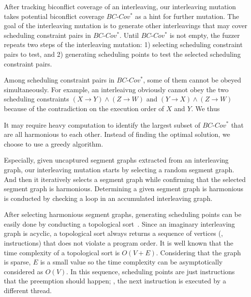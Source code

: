 \newcommand{\segment}{segment graph\xspace}
\newcommand{\segments}{segment graphs\xspace}
\newcommand{\Segments}{Segment graphs\xspace}


After tracking biconflict coverage of an interleaving, our
interleaving mutation takes potential biconflict coverage
$BC\mbox{-}Cov^*$ as a hint for further mutation.
%
The goal of the interleaving mutation is to generate other
interleavings that may cover scheduling constraint pairs in
$BC\mbox{-}Cov^*$.
%
Until $BC\mbox{-}Cov^*$ is not empty, the fuzzer repeats two steps of
the interleaving mutation:
%
1) selecting scheduling constraint pairs to test, and
2) generating scheduling points to test the selected scheduling
constraint pairs.


%
Among scheduling constraint pairs in $BC\mbox{-}Cov^*$, some of them
cannot be obeyed simultaneously.
%
For example, an interleaivng obviously cannot obey the two scheduling
constraints $(X \rightarrow Y)\wedge (Z \rightarrow W)$ and
$(Y \rightarrow X)\wedge (Z \rightarrow W)$ because of the
contradiction on the execution order of $X$ and $Y$.
%
We thus 


It may require heavy computation to identify the largest subset of
$BC\mbox{-}Cov^*$ that are all harmonious to each other.
%
Instead of finding the optimal solution, we choose to use a greedy
algorithm.
%


Especially, given uncaptured \segments extracted from an interleaving
graph, our interleaving mutation starts by selecting a random
\segment.
%
And then it iteratively selects a \segment while confirming that the
selected \segment is harmonious.
%
Determining a given \segment is harmonious is conducted by checking a
loop in an accumulated interleaving graph.



%
After selecting harmonious \segments, generating scheduling points can
be easily done by conducting a topological
sort~\cite{topologicalsort}.
%
Since an imaginary interleaving graph is acyclic, a topological sort
always returns a sequence of vertices (\ie, instructions) that does
not violate a program order.
%
It is well known that the time complexity of a topological sort is
$O(V+E)$. Considering that the graph is sparse, $E$ is a small value
so the time complexity can be asymptotically considered as $O(V)$.
%
In this sequence, scheduling points are just instructions that the
preemption should happen; \ie, the next instruction is executed by a
different thread.
%



